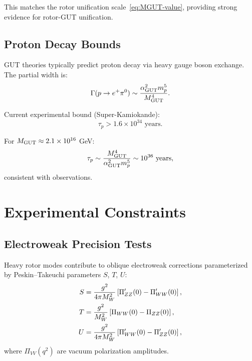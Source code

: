 \documentclass[11pt,a4paper]{article}
\numberwithin{equation}{section}
\theoremstyle{plain}
\theoremstyle{definition}
\theoremstyle{remark}
\begin{document}
This matches the rotor unification scale~\eqref{eq:MGUT-value}, providing strong evidence for rotor-GUT unification.

\subsection{Proton Decay Bounds}

GUT theories typically predict proton decay via heavy gauge boson exchange. The partial width is:
\begin{equation}
\Gamma(p\to e^+\pi^0) \sim \frac{\alpha_{\rm GUT}^2 m_p^5}{M_{\rm GUT}^4}.
\label{eq:proton-decay}
\end{equation}

Current experimental bound (Super-Kamiokande):
\begin{equation}
\tau_p > 1.6\times 10^{34}\text{ years}.
\label{eq:tau-p-bound}
\end{equation}

For $M_{\rm GUT}\approx 2.1\times 10^{16}$ GeV:
\begin{equation}
\tau_p \sim \frac{M_{\rm GUT}^4}{\alpha_{\rm GUT}^2 m_p^5} \sim 10^{36}\text{ years},
\label{eq:tau-p-prediction}
\end{equation}
consistent with observations.

\vspace{1em}

\section{Experimental Constraints}\label{sec:exp}

\subsection{Electroweak Precision Tests}

Heavy rotor modes contribute to oblique electroweak corrections parameterized by Peskin--Takeuchi parameters $S$, $T$, $U$:
\begin{align}
S &= \frac{g^2}{4\pi M_W^2}\left[\Pi_{ZZ}'(0) - \Pi_{WW}'(0)\right], \notag\\
T &= \frac{g^2}{M_W^2}\left[\Pi_{WW}(0) - \Pi_{ZZ}(0)\right], \notag\\
U &= \frac{g^2}{4\pi M_W^2}\left[\Pi_{WW}'(0) - \Pi_{ZZ}'(0)\right],
\label{eq:STU}
\end{align}
where $\Pi_{VV}(q^2)$ are vacuum polarization amplitudes.
\end{document}
